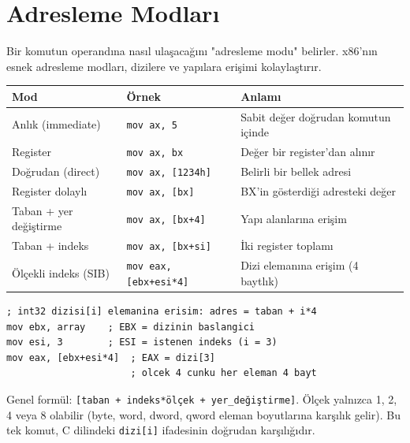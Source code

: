 \documentclass[11pt,a4paper]{article}
\newcommand{\kod}[1]{\texttt{\color{koyuGri}#1}}
\begin{document}
\section{Adresleme Modları}

Bir komutun operandına nasıl ulaşacağını "adresleme modu" belirler. x86'nın
esnek adresleme modları, dizilere ve yapılara erişimi kolaylaştırır.

\begin{center}
\begin{tabularx}{\textwidth}{@{}l l >{\raggedright\arraybackslash}X@{}}
\toprule
\rowcolor{anaMavi}\color{white}\textbf{Mod} & \color{white}\textbf{Örnek} & \color{white}\textbf{Anlamı} \\
\midrule
Anlık (immediate) & \kod{mov ax, 5} & Sabit değer doğrudan komutun içinde \\
\rowcolor{acikGri} Register & \kod{mov ax, bx} & Değer bir register'dan alınır \\
Doğrudan (direct) & \kod{mov ax, [1234h]} & Belirli bir bellek adresi \\
\rowcolor{acikGri} Register dolaylı & \kod{mov ax, [bx]} & BX'in gösterdiği adresteki değer \\
Taban + yer değiştirme & \kod{mov ax, [bx+4]} & Yapı alanlarına erişim \\
\rowcolor{acikGri} Taban + indeks & \kod{mov ax, [bx+si]} & İki register toplamı \\
Ölçekli indeks (SIB) & \kod{mov eax, [ebx+esi*4]} & Dizi elemanına erişim (4 baytlık) \\
\bottomrule
\end{tabularx}
\end{center}

\begin{ornekkutu}
\begin{lstlisting}
; int32 dizisi[i] elemanina erisim: adres = taban + i*4
mov ebx, array    ; EBX = dizinin baslangici
mov esi, 3        ; ESI = istenen indeks (i = 3)
mov eax, [ebx+esi*4]  ; EAX = dizi[3]
                      ; olcek 4 cunku her eleman 4 bayt
\end{lstlisting}
\end{ornekkutu}

\begin{bilgikutu}
Genel formül: \kod{[taban + indeks*ölçek + yer\_değiştirme]}. Ölçek yalnızca
1, 2, 4 veya 8 olabilir (byte, word, dword, qword eleman boyutlarına karşılık
gelir). Bu tek komut, C dilindeki \kod{dizi[i]} ifadesinin doğrudan
karşılığıdır.
\end{bilgikutu}
\end{document}
